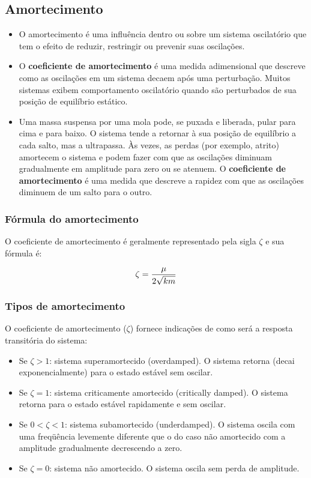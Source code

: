\subsection{Amortecimento}

\begin{itemize}
	
\item O amortecimento é uma influência dentro ou sobre um sistema oscilatório que tem o efeito de reduzir, restringir ou prevenir suas oscilações.
 
\item O \textbf{coeficiente de amortecimento} é uma medida adimensional que descreve como as oscilações em um sistema decaem após uma perturbação. Muitos sistemas exibem comportamento oscilatório quando são perturbados de sua posição de equilíbrio estático.

\item Uma massa suspensa por uma mola pode, se puxada e liberada, pular para cima e para baixo. O sistema tende a retornar à sua posição de equilíbrio a cada salto, mas a ultrapassa. Às vezes, as perdas (por exemplo, atrito) amortecem o sistema e podem fazer com que as oscilações diminuam gradualmente em amplitude para zero ou se atenuem. O \textbf{coeficiente de amortecimento} é uma medida que descreve a rapidez com que as oscilações diminuem de um salto para o outro. 

\end{itemize}

\subsubsection{Fórmula do amortecimento}

O coeficiente de amortecimento é geralmente representado pela sigla $\zeta$ e sua fórmula é:

\[ \large \zeta = \frac{\mu}{2\sqrt{km}}\]

\subsubsection{Tipos de amortecimento}

O coeficiente de amortecimento ($\zeta$) fornece indicações de como será a resposta transitória do sistema:

\begin{itemize}
\item Se $\zeta > 1$: sistema superamortecido (overdamped). O sistema retorna (decai exponencialmente) para o estado estável sem oscilar.
\item Se $\zeta = 1$: sistema criticamente amortecido (critically damped). O sistema retorna para o estado estável rapidamente e sem oscilar.
\item Se $0 < \zeta < 1$: sistema subamortecido (underdamped).  O sistema oscila com uma freqüência levemente diferente que o do caso não amortecido com a amplitude gradualmente decrescendo a zero.
\item Se $\zeta = 0$: sistema não amortecido. O sistema oscila sem perda de amplitude.

\end{itemize}


